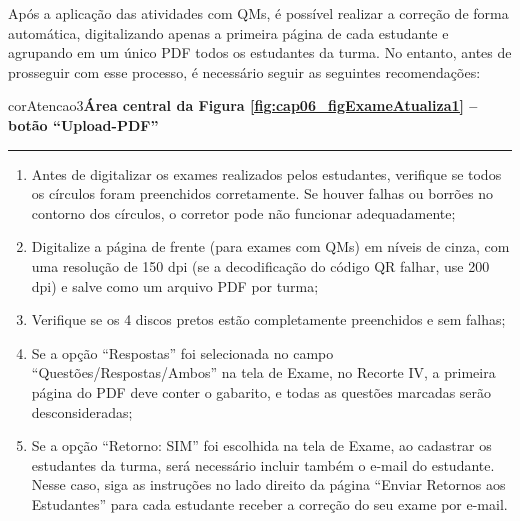 Após a aplicação das atividades com QMs, é possível realizar a correção de forma automática, digitalizando apenas a primeira página de cada estudante e agrupando em um único PDF todos os estudantes da turma. No entanto, antes de prosseguir com esse processo, é necessário seguir as seguintes recomendações:

\begin{myboxCode}{corAtencao3}{\textbf{Área central da Figura \ref{fig:cap06_figExameAtualiza1} -- botão ``Upload-PDF''}}\\\vspace{-3mm}\hrule\vspace{1mm}
{\footnotesize
\begin{enumerate}[itemsep=-1mm]
    \item Antes de digitalizar os exames realizados pelos estudantes, verifique se todos os círculos foram preenchidos corretamente. Se houver falhas ou borrões no contorno dos círculos, o corretor pode não funcionar adequadamente;
    \item Digitalize a página de frente (para exames com QMs) em níveis de cinza, com uma resolução de 150 dpi (se a decodificação do código QR falhar, use 200 dpi) e salve como um arquivo PDF por turma;
    \item Verifique se os 4 discos pretos estão completamente preenchidos e sem falhas;
    \item Se a opção ``Respostas'' foi selecionada no campo ``Questões/Respostas/Ambos'' na tela de Exame, no Recorte IV, a primeira página do PDF deve conter o gabarito, e todas as questões marcadas serão desconsideradas;
    \item Se a opção ``Retorno: SIM'' foi escolhida na tela de Exame, ao cadastrar os estudantes da turma, será necessário incluir também o e-mail do estudante. Nesse caso, siga as instruções no lado direito da página ``Enviar Retornos aos Estudantes'' para cada estudante receber a correção do seu exame por e-mail.
\end{enumerate}
}
\end{myboxCode}


